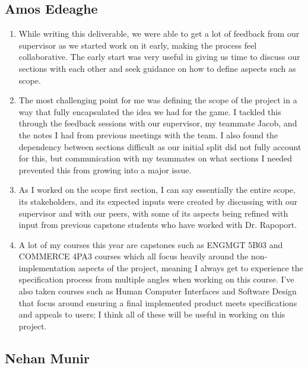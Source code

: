 \documentclass[12pt]{article}
\begin{document}
\subsection*{Amos Edeaghe}
\begin{enumerate}
\item While writing this deliverable, we were able to get a lot of feedback from our supervisor as we started work on it early, making the process feel
collaborative. The early start was very useful in giving us time to discuss our sections with each other and seek guidance on how to define aspects such as scope.
\item The most challenging point for me was defining the scope of the project in a way that fully encapsulated the idea we had for the game. I tackled this through the feedback sessions with our supervisor, my teammate Jacob, and the notes I had from previous meetings
with the team. I also found the dependency between sections difficult as our initial split did not fully account for this, but communication with my teammates on what sections I needed prevented this from growing into a major issue.
\item As I worked on the scope first section, I can say essentially the entire scope, its stakeholders, and its expected inputs were created by discussing with our supervisor and with our peers, with some of its aspects being refined with input from previous capstone students who have worked with Dr. Rapoport.
\item A lot of my courses this year are capstones such as ENGMGT 5B03 and COMMERCE 4PA3 courses which all focus heavily around the non-implementation aspects of the project, meaning I always get to experience the specification process from multiple angles when working on this course. I've also taken
courses such as Human Computer Interfaces and Software Design that focus around ensuring a final implemented product meets specifications and appeals to users; I think all of these will be useful in working on this project.
\end{enumerate}

\subsection*{Nehan Munir}
\end{document}
